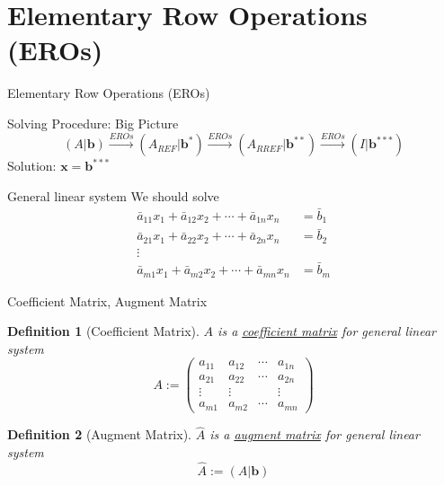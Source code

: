 \documentclass[a4paper,11pt]{article}
\newtheorem{defn}{Definition}
\begin{document}
\section{Elementary Row Operations (EROs)} %
\label{sec:elementary_row_operations_eros}
\begin{frame}[t]{Elementary Row Operations (EROs)}
	\begin{block}
		{Solving Procedure: Big Picture}
		\[
			(A\vert \mathbf{b}) \xrightarrow{EROs} (A_{REF}\vert \mathbf{b}^\ast) \xrightarrow{EROs} (A_{RREF}\vert \mathbf{b}^{\ast\ast}) \xrightarrow{EROs} (I|\mathbf{b}^{\ast\ast\ast})
		\]
		Solution: $\mathbf{x} = \mathbf{b}^{\ast\ast\ast}$
	\end{block}
	\begin{block}
		{General linear system} We should solve 
		\begin{align*}
			\bar a_{11} x_1 + \bar a_{12}x_2 + \cdots + \bar a_{1n}x_n &= \bar b_1\\
			\bar a_{21} x_1 + \bar a_{22}x_2 + \cdots + \bar a_{2n}x_n &= \bar b_2\\
			\vdots\\
			\bar a_{m1} x_1 + \bar a_{m2}x_2 + \cdots + \bar a_{mn}x_n &= \bar b_m
		\end{align*}
	\end{block}
\end{frame}
\begin{frame}[t]{Coefficient Matrix, Augment Matrix}
	\begin{defn}
		[Coefficient Matrix]
		$A$ is a \uline{coefficient matrix} for general linear system
		\[
			A := \begin{pmatrix}
				a_{11}&a_{12}&\cdots& a_{1n}\\
				a_{21}&a_{22}&\cdots& a_{2n}\\
				\vdots&\vdots&&\vdots\\
				a_{m1}&a_{m2}&\cdots& a_{mn}
			\end{pmatrix}
		\]
	\end{defn}
	\begin{defn}
		[Augment Matrix]
		$\hat A$ is a \uline{augment matrix} for general linear system
		\[
			\hat A := (A\vert \mathbf{b}) 
		\]
	\end{defn}
\end{frame}
\end{document}

